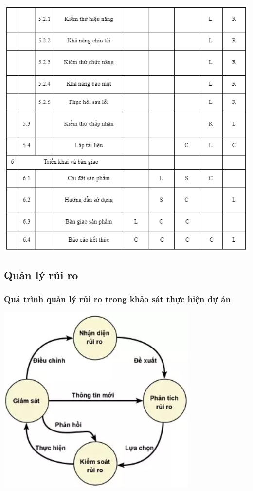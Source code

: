 \documentclass[12pt]{article}
\begin{document}
\par
\hspace{-0.6cm}\includegraphics[width=15cm]{II_6_5_4.png}
\vspace{0.5cm}

\subsection{Quản lý rủi ro}
\subsubsection{Quá trình quản lý rủi ro trong khảo sát thực hiện dự án}
\includegraphics[width=10cm]{II_7_1.png}
\vspace{0.5cm}
\end{document}
